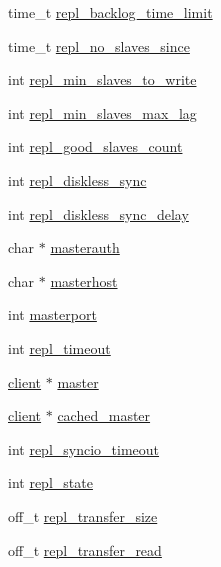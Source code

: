 \begin{DoxyCompactItemize}
\item 
time\+\_\+t \hyperlink{structredis_server_a959bf5f04d138a3af6b360b20d5d25bd}{repl\+\_\+backlog\+\_\+time\+\_\+limit}
\item 
time\+\_\+t \hyperlink{structredis_server_aa24c62412daaae8c6a8356c85524b7c7}{repl\+\_\+no\+\_\+slaves\+\_\+since}
\item 
int \hyperlink{structredis_server_a2948a0fa6ec92b071befb3e78fd57b2f}{repl\+\_\+min\+\_\+slaves\+\_\+to\+\_\+write}
\item 
int \hyperlink{structredis_server_ad3b224fc091bae066a03314069adf205}{repl\+\_\+min\+\_\+slaves\+\_\+max\+\_\+lag}
\item 
int \hyperlink{structredis_server_a4a1716a96025de1fff867e1af23329e9}{repl\+\_\+good\+\_\+slaves\+\_\+count}
\item 
int \hyperlink{structredis_server_ad28a95e9b6cd31f5feb7ebe5a8a8992a}{repl\+\_\+diskless\+\_\+sync}
\item 
int \hyperlink{structredis_server_a2f5a9f08effdaba922ea7a432c753175}{repl\+\_\+diskless\+\_\+sync\+\_\+delay}
\item 
char $\ast$ \hyperlink{structredis_server_a22a84652dad6047f6c28d032b3c8327e}{masterauth}
\item 
char $\ast$ \hyperlink{structredis_server_a7f25b998323782ef03f738b92d3eac69}{masterhost}
\item 
int \hyperlink{structredis_server_a8310dd417853e8153b749f1be9afe9b0}{masterport}
\item 
int \hyperlink{structredis_server_af8b98ad90dc60d4e8b2bf836b518e198}{repl\+\_\+timeout}
\item 
\hyperlink{structclient}{client} $\ast$ \hyperlink{structredis_server_af992bf15650bd1a57d0eab937c2042df}{master}
\item 
\hyperlink{structclient}{client} $\ast$ \hyperlink{structredis_server_aa6d326e1db1991e81cd897babf52ea8d}{cached\+\_\+master}
\item 
int \hyperlink{structredis_server_aca3e40a81aabd234727f99625efdd84c}{repl\+\_\+syncio\+\_\+timeout}
\item 
int \hyperlink{structredis_server_a185612136a48819bd307781e32e7b3a9}{repl\+\_\+state}
\item 
off\+\_\+t \hyperlink{structredis_server_a31c9cafcb063d450af2fa2a760f7b6c9}{repl\+\_\+transfer\+\_\+size}
\item 
off\+\_\+t \hyperlink{structredis_server_a159af50e60cf5a0b6b06ab72332a4fb8}{repl\+\_\+transfer\+\_\+read}
\item 

\end{DoxyCompactItemize}

